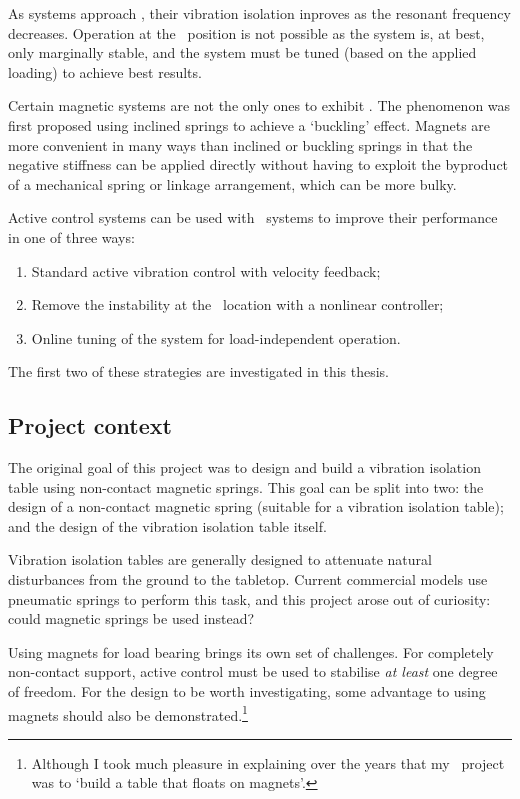 As systems approach \qzs, their vibration isolation inproves as the resonant frequency decreases. Operation at the \qzs\ position is not possible as the system is, at best, only marginally stable, and the system must be tuned (based on the applied loading) to achieve best results.

Certain magnetic systems are not the only ones to exhibit \qzs. The phenomenon was first proposed using inclined springs to achieve a `buckling' effect. Magnets are more convenient in many ways than inclined or buckling springs in that the negative stiffness can be applied directly without having to exploit the byproduct of a mechanical spring or linkage arrangement, which can be more bulky.

Active control systems can be used with \qzs\ systems to improve their performance in one of three ways:
\begin{enumerate}
  \item Standard active vibration control with velocity feedback;
  \item Remove the instability at the \qzs\ location with a nonlinear controller;
  \item Online tuning of the system for load-independent operation.
\end{enumerate}
The first two of these strategies are investigated in this thesis.

\subsection{Project context}

The original goal of this project was to design and build a vibration
isolation table using non-contact magnetic springs. This goal can be
split into two: the design of a non-contact magnetic spring (suitable
for a vibration isolation table); and the design of the vibration
isolation table itself.

Vibration isolation tables are generally designed to attenuate natural
disturbances from the ground to the tabletop. Current commercial models use
pneumatic springs to perform this task, and this project arose out of
curiosity: could magnetic springs be used instead?

Using magnets for load bearing brings its own set of challenges. For
completely non-contact support, active control must be used to
stabilise \emph{at least} one degree of freedom. For the design to be
worth investigating, some advantage to using magnets should also be
demonstrated.\footnote{Although I took much pleasure in explaining
  over the years that my \PhD\ project was to `build a table that
  floats on magnets'.}

